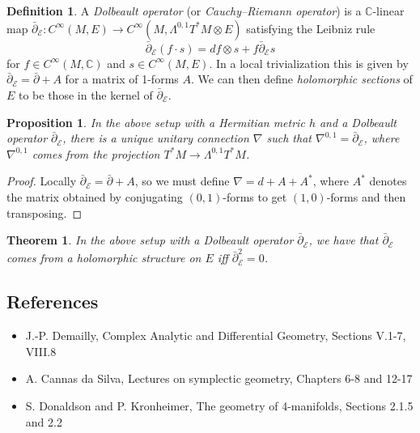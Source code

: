 \documentclass[a4paper]{article}
\newtheorem*{theorem}{Theorem}
\newtheorem*{proposition}{Proposition}
\theoremstyle{definition}
\newtheorem*{definition}{Definition}
\theoremstyle{remark}
\newcommand{\E}{\mathcal{E}}
\newcommand{\C}{\mathbb{C}}
\begin{document}
\begin{definition}
    A \emph{Dolbeault operator} (or \emph{Cauchy--Riemann operator}) is a
    $\C$-linear map
    $\bar\partial_\E:C^\infty(M,E)\to C^\infty(M,\Lambda^{0,1}T^*M\otimes E)$
    satisfying the Leibniz rule
    \begin{equation*}
        \bar\partial_\E(f\cdot s) = df\otimes s + f\bar\partial_\E s
    \end{equation*}
    for $f\in C^\infty(M,\C)$ and $s\in C^\infty(M,E)$. In a local
    trivialization this is given by $\bar\partial_\E=\bar\partial+A$ for a
    matrix of 1-forms $A$. We can then define \emph{holomorphic sections} of $E$
    to be those in the kernel of $\bar\partial_\E$.
\end{definition}

\begin{proposition}
    In the above setup with a Hermitian metric $h$ and a Dolbeault operator
    $\bar\partial_\E$, there is a unique unitary connection $\nabla$ such that
    $\nabla^{0,1}=\bar\partial_\E$, where $\nabla^{0,1}$ comes from the
    projection $T^*M\to\Lambda^{0,1}T^*M$.
\end{proposition}

\begin{proof}
    Locally $\bar\partial_\E=\bar\partial+A$, so we must define $\nabla=d+A+A^*$,
    where $A^*$ denotes the matrix obtained by conjugating $(0,1)$-forms to get
    $(1,0)$-forms and then transposing.
\end{proof}

\begin{theorem}
    In the above setup with a Dolbeault operator $\bar\partial_\E$, we have that
    $\bar\partial_\E$ comes from a holomorphic structure on $E$ iff
    $\bar\partial_\E^2=0$.
\end{theorem}

\subsection*{References}

\begin{itemize}
    \item J.-P. Demailly, Complex Analytic and Differential Geometry, Sections
        V.1-7, VIII.8

    \item A. Cannas da Silva, Lectures on symplectic geometry, Chapters 6-8 and
        12-17

    \item S. Donaldson and P. Kronheimer, The geometry of 4-manifolds, Sections
        2.1.5 and 2.2
\end{itemize}
\end{document}
